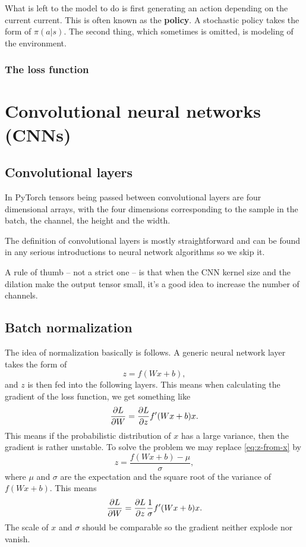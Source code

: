 \documentclass[hyperref, a4paper, 12pt]{report}
\newcommand*{\concept}[1]{{\textbf{#1}}}
\begin{document}
What is left to the model to do is first generating an action depending on the current current.
This is often known as the \concept{policy}.
A stochastic policy takes the form of $\pi(a | s)$.
The second thing, which sometimes is omitted, is modeling of the environment.

\subsection{The loss function}



\chapter{Convolutional neural networks (CNNs)}

\section{Convolutional layers}

In PyTorch tensors being passed between convolutional layers are four dimensional arrays,
with the four dimensions corresponding to the sample in the batch, the channel, the height and the width.

The definition of convolutional layers is mostly straightforward
and can be found in any serious introductions to neural network algorithms so we skip it.

A rule of thumb -- not a strict one -- is that when the CNN kernel size and the dilation make the output tensor small,
it's a good idea to increase the number of channels.

\section{Batch normalization}\label{sec:cnn.batch-norm}

The idea of normalization basically is follows.
A generic neural network layer takes the form of 
\begin{equation}
    z = f(Wx + b),
    \label{eq:z-from-x}
\end{equation}
and $z$ is then fed into the following layers.
This means when calculating the gradient of the loss function, we get something like 
\begin{equation}
    \pdv{L}{W} = \pdv{L}{z} f'(Wx + b) x.
\end{equation}
This means if the probabilistic distribution of $x$ has a large variance,
then the gradient is rather unstable.
To solve the problem we may replace \eqref{eq:z-from-x} by 
\begin{equation}
    z = \frac{f(Wx + b) - \mu}{\sigma},
\end{equation}
where $\mu$ and $\sigma$ are the expectation and the square root of the variance of $f(Wx + b)$.
This means 
\begin{equation}
    \pdv{L}{W} = \pdv{L}{z} \frac{1}{\sigma} f'(W x + b) x.
\end{equation}
The scale of $x$ and $\sigma$ should be comparable so the gradient neither explode nor vanish.
\end{document}
